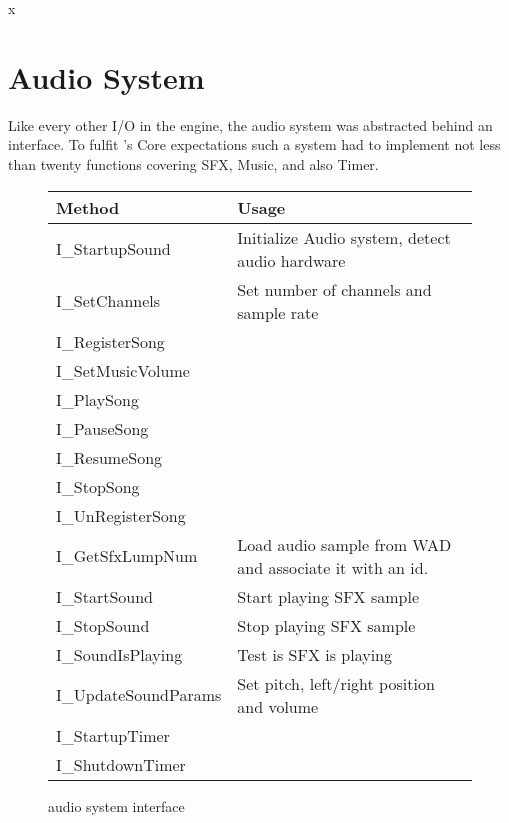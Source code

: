 x\section{Audio System}
\label{dmx_section}
Like every other I/O in the engine, the audio system was abstracted behind an interface. To fulfit \doom's Core expectations such a system had to implement not less than twenty functions covering SFX, Music, and also Timer.\\
\par
 \begin{figure}[H]
\centering  
\begin{tabularx}{\textwidth}{ L{0.6}  L{1.4}}
  \toprule
  \textbf{Method} &  \textbf{Usage}\\

  \toprule 
  I\_StartupSound & Initialize Audio system, detect audio hardware\\
  I\_SetChannels & Set number of channels and sample rate\\
  \toprule 
   
I\_RegisterSong & \\
I\_SetMusicVolume &\\
I\_PlaySong &\\
I\_PauseSong &\\
I\_ResumeSong &\\
I\_StopSong &\\
I\_UnRegisterSong & \\




  \toprule 
I\_GetSfxLumpNum & Load audio sample from WAD and associate it with an id.\\
I\_StartSound & Start playing SFX sample\\
I\_StopSound & Stop playing SFX sample\\
I\_SoundIsPlaying & Test is SFX is playing\\
I\_UpdateSoundParams & Set pitch, left/right position and volume\\

  \toprule 
  
I\_StartupTimer &\\
I\_ShutdownTimer &\\

  \toprule 



   \toprule
\end{tabularx}
\caption{\doom audio system interface}
\end{figure}



